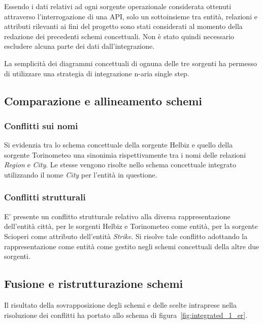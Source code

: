 Essendo i dati relativi ad ogni sorgente operazionale considerata ottenuti
attraverso l'interrogazione di una API, solo un sottoinsieme tra entità,
relazioni e attributi rilevanti ai fini del progetto sono stati considerati
al momento della redazione dei precedenti schemi concettuali. Non è stato
quindi necessario escludere alcuna parte dei dati dall'integrazione. 

La semplicità dei diagrammi concettuali di ognuna delle tre sorgenti ha
permesso di utilizzare una strategia di integrazione n-aria single step.

\subsection{Comparazione e allineamento schemi}

\subsubsection{Conflitti sui nomi}

Si evidenzia tra lo schema concettuale della sorgente Helbiz e quello della
sorgente Torinometeo una sinonimia rispettivamente tra i nomi delle
relazioni \textit{Region} e \textit{City}. Le stesse vengono risolte nello
schema concettuale integrato utilizzando il nome \textit{City} per l'entità
in questione.

\subsubsection{Conflitti strutturali}
E' presente un conflitto strutturale relativo alla diversa rappresentazione 
dell'entità città, per le sorgenti Helbiz e Torinometeo come entità,
per la sorgente Scioperi come attributo dell'entità \textit{Strike}.
Si risolve tale conflitto adottando la rappresentazione come entità
come gestito negli schemi concettuali della altre due sorgenti.

\subsection{Fusione e ristrutturazione schemi}

Il risultato della sovrapposizione degli schemi e delle scelte intraprese nella
risoluzione dei conflitti ha portato allo schema di figura~\ref{fig:integrated_1_er}.

